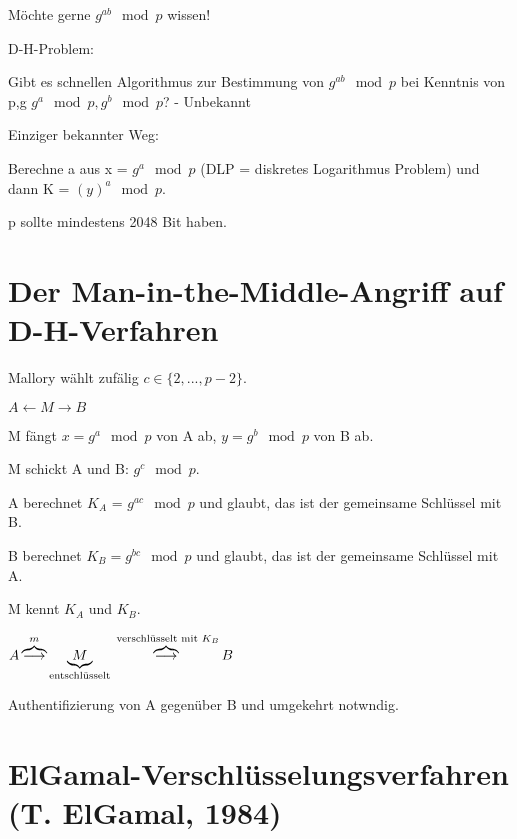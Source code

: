 \begin{enumerate}[label=(\alph*)]
    Möchte gerne $g^{ab} \mod p$ wissen!

    \par \medskip

    \par \medskip

    D-H-Problem:

    Gibt es schnellen Algorithmus zur Bestimmung von $g^{ab} \mod p$ bei Kenntnis von p,g $g^a \mod p, g^b \mod p$? - Unbekannt

    \par \medskip

    Einziger bekannter Weg: 

    Berechne a aus x = $g^a \mod p$ (DLP = diskretes Logarithmus Problem) und dann K = $(y)^a \mod p$.

    p sollte mindestens 2048 Bit haben.
  \end{enumerate}

  \section{Der Man-in-the-Middle-Angriff auf D-H-Verfahren}

  Mallory wählt zufälig $c \in \{2,...,p-2\}$.

  \begin{center}
    $A \leftarrow M \rightarrow B$
  \end{center}

  M fängt $x = g^a \mod p$ von A ab, $y = g^b \mod p$ von B ab.

  M schickt A und B: $g^c \mod p$.

  A berechnet $K_A$ = $g^{ac} \mod p$ und glaubt, das ist der gemeinsame Schlüssel mit B.

  B berechnet $K_B = g^{bc} \mod p$ und glaubt, das ist der gemeinsame Schlüssel mit A.

  \par \medskip

  M kennt $K_A$ und $K_B$.

  \par \medskip

  $A \overbrace{\longrightarrow}^{m} \underbrace{M}_{\textnormal{entschlüsselt}} \overbrace{\longrightarrow}^{\textnormal{ verschlüsselt mit $K_B$}} B$

  \par \medskip
  
  Authentifizierung von A gegenüber B und umgekehrt notwndig.

  \section{ElGamal-Verschlüsselungsverfahren (T. ElGamal, 1984)}

